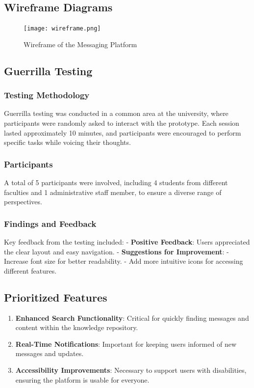 \documentclass[12pt,a4paper]{article}
\begin{document}
\subsection{Wireframe Diagrams}
\begin{figure}[h]
\centering
\texttt{[image: wireframe.png]} %
\caption{Wireframe of the Messaging Platform}
\label{fig:wireframe}
\end{figure}

\subsection{Guerrilla Testing}
\subsubsection{Testing Methodology}
Guerrilla testing was conducted in a common area at the university, where participants were randomly asked to interact with the prototype. Each session lasted approximately 10 minutes, and participants were encouraged to perform specific tasks while voicing their thoughts.

\subsubsection{Participants}
A total of 5 participants were involved, including 4 students from different faculties and 1 administrative staff member, to ensure a diverse range of perspectives.

\subsubsection{Findings and Feedback}
Key feedback from the testing included:
- \textbf{Positive Feedback}: Users appreciated the clear layout and easy navigation.
- \textbf{Suggestions for Improvement}:
  - Increase font size for better readability.
  - Add more intuitive icons for accessing different features.

\subsection{Prioritized Features}
\begin{enumerate}
  \item \textbf{Enhanced Search Functionality}: Critical for quickly finding messages and content within the knowledge repository.
  \item \textbf{Real-Time Notifications}: Important for keeping users informed of new messages and updates.
  \item \textbf{Accessibility Improvements}: Necessary to support users with disabilities, ensuring the platform is usable for everyone.
\end{enumerate}
\end{document}
